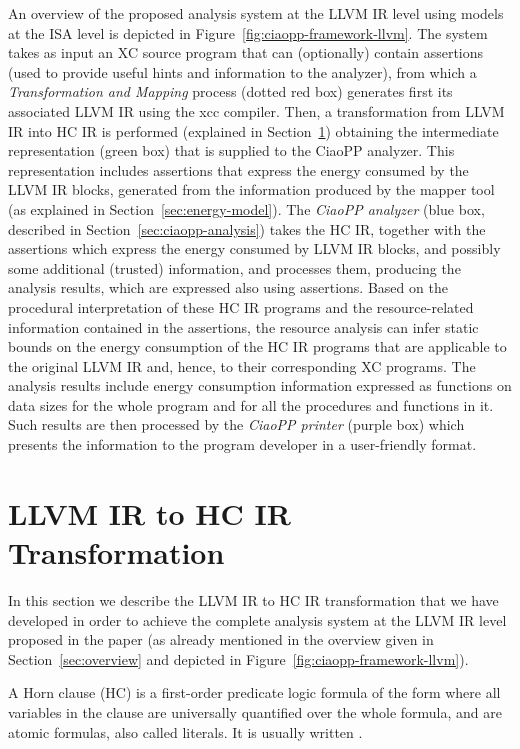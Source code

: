\documentclass{llncs}
\newcommand{\level}{level\xspace}
\newcommand{\hcir}{HC IR\xspace}
\newcommand{\llvmir}{LLVM IR\xspace}
\newcommand{\ciaopp}{CiaoPP\xspace}
\begin{document}
An overview of the proposed analysis system at the \llvmir \level
using models at the ISA \level is depicted in
Figure~\ref{fig:ciaopp-framework-llvm}.
The system takes as input an XC source program that can (optionally)
contain assertions (used to provide useful hints and information to
the analyzer), from which a \emph{Transformation and Mapping} process
(dotted red box) generates first its associated \llvmir using the xcc
compiler. Then, a transformation from \llvmir into \hcir is performed
(explained in Section~\ref{sec:llvm-ciao-translation}) obtaining the
intermediate representation (green box) that is supplied to the
\ciaopp analyzer. This representation includes assertions that express
the energy consumed by the \llvmir blocks, generated from the
information produced by the mapper tool (as explained in
Section~\ref{sec:energy-model}). The \emph{\ciaopp analyzer} (blue
box, described in Section~\ref{sec:ciaopp-analysis}) takes the \hcir,
together with the assertions which express the energy consumed by
\llvmir blocks, and possibly some additional (trusted) information,
and processes them, producing the analysis results, which are
expressed also using assertions.
Based on the procedural interpretation of these \hcir programs and 
the resource-related information contained in the assertions, the resource
analysis can infer static bounds on the energy
consumption of the \hcir programs that are applicable to the original
\llvmir and, hence, to their corresponding XC programs.
The analysis results include energy consumption information expressed
as functions on data sizes for the whole program and for all the
procedures and functions in it. Such results are then processed by the
\emph{\ciaopp printer} (purple box) which presents the
information to the program developer in a user-friendly format.

\section{\llvmir to \hcir Transformation}
\label{sec:llvm-ciao-translation}
In this section we describe the \llvmir to \hcir transformation that
we have developed in order to achieve the complete analysis system
at the \llvmir \level proposed in the paper (as already mentioned in the
overview given in Section~\ref{sec:overview} and depicted in
Figure~\ref{fig:ciaopp-framework-llvm}).

A Horn clause (HC) is a first-order predicate logic formula of the form  where all variables in the clause are universally quantified over the whole formula, and  are atomic formulas, also called literals.  It is usually written .
\end{document}
